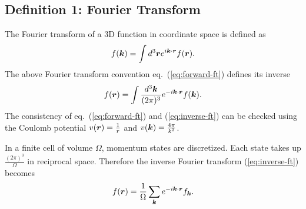 \subsection{Definition 1: Fourier Transform}
The Fourier transform of a 3D function in coordinate space is defined as
\begin{align}
f(\boldsymbol{k}) = \int d^3\boldsymbol{r} e^{i\boldsymbol{k}\cdot\boldsymbol{r}} f(\boldsymbol{r}). \label{eq:forward-ft}
\end{align}
The above Fourier transform convention eq.~(\ref{eq:forward-ft}) defines its inverse
\begin{align}
f(\boldsymbol{r}) = \int \frac{d^3\boldsymbol{k}}{(2\pi)^3} e^{-i\boldsymbol{k}\cdot\boldsymbol{r}} f(\boldsymbol{k}). \label{eq:inverse-ft}
\end{align}
The consistency of eq.~(\ref{eq:forward-ft}) and (\ref{eq:inverse-ft}) can be checked using the Coulomb potential $v(\boldsymbol{r})=\frac{1}{r}$ and $v(\boldsymbol{k})=\frac{4\pi}{k^2}$. 

In a finite cell of volume $\Omega$, momentum states are discretized. Each state takes up $\frac{(2\pi)^3}{\Omega}$ in reciprocal space. Therefore the inverse Fourier transform (\ref{eq:inverse-ft}) becomes
\begin{align}
f(\boldsymbol{r}) = \frac{1}{\Omega} \sum\limits_{\boldsymbol{k}} e^{-i\boldsymbol{k}\cdot\boldsymbol{r}} f_{\boldsymbol{k}}.
\end{align}

